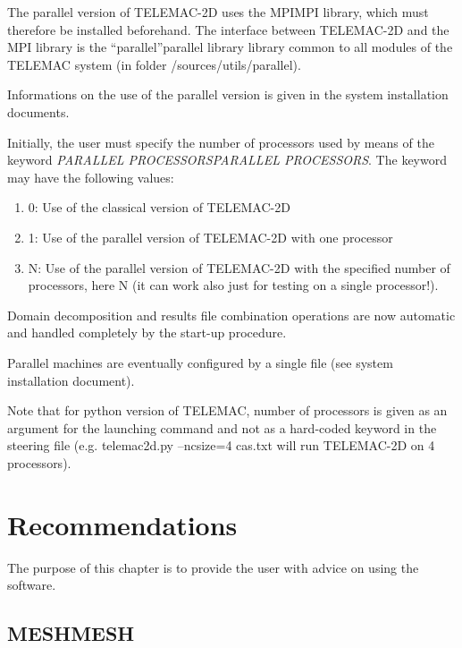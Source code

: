 \documentclass{article} %
\begin{document}
 The parallel version of TELEMAC-2D uses the MPIMPI library, which must therefore be installed beforehand. The interface between TELEMAC-2D and the MPI library is the ``parallel''parallel library library common to all modules of the TELEMAC system (in folder /sources/utils/parallel).

 Informations on the use of the parallel version is given in the system installation documents.

 Initially, the user must specify the number of processors used by means of the keyword \textit{PARALLEL PROCESSORSPARALLEL PROCESSORS}. The keyword may have the following values:

\begin{enumerate}
\item  0: Use of the classical version of TELEMAC-2D

\item  1: Use of the parallel version of TELEMAC-2D with one processor

\item  N: Use of the parallel version of TELEMAC-2D with the specified number of processors, here N (it can work also just for testing on a single processor!).
\end{enumerate}

 Domain decomposition and results file combination operations are now automatic and handled completely by the start-up procedure.

 Parallel machines are eventually configured by a single file (see system installation document).

 Note that for python version of TELEMAC, number of processors is given as an argument for the launching command and not as a hard-coded keyword in the steering file (e.g. telemac2d.py --ncsize=4 cas.txt will run TELEMAC-2D on 4 processors).












\section{  Recommendations}

 The purpose of this chapter is to provide the user with advice on using the software.


\subsection{ MESHMESH}
\end{document}
